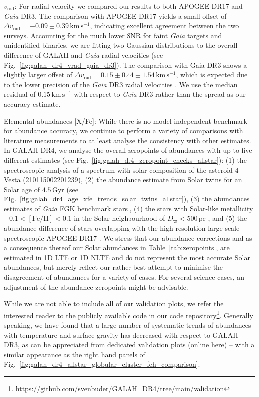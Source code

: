 \documentclass[
  journal=pasa,
  manuscript=research-paper, %
  year=2024,
  volume=37
]{cup-journal}
\newcommand{\vrad}{$v_\mathrm{rad}$\xspace}
\newcommand{\Gaia}{\textit{Gaia}\xspace}
\begin{document}
\vrad: For radial velocity we compared our results to both APOGEE DR17 and \Gaia DR3. The comparison with APOGEE DR17 yields a small offset of $\Delta v_\mathrm{rad} = -0.09 \pm 0.39\,\mathrm{km\,s^{-1}}$, indicating excellent agreement between the two surveys. Accounting for the much lower SNR for faint \Gaia targets and unidentified binaries, we are fitting two Gaussian distributions to the overall difference of GALAH and \Gaia radial velocities (see Fig.~\ref{fig:galah_dr4_vrad_gaia_dr3}). The comparison with Gaia DR3 shows a slightly larger offset of $\Delta v_\mathrm{rad} = 0.15 \pm 0.44 \pm 1.54\,\mathrm{km\,s^{-1}}$, which is expected due to the lower precision of the \Gaia DR3 radial velocities \citep{Katz2023}. We use the median residual of $0.15\,\mathrm{km\,s^{-1}}$ with respect to \Gaia DR3 rather than the spread as our accuracy estimate.

Elemental abundances [X/Fe]: While there is no model-independent benchmark for abundance accuracy, we continue to perform a variety of comparisons with literature measurements to at least analyse the consistency with other estimates. In GALAH DR4, we analyse the overall zeropoints of abundances with up to five different estimates (see Fig.~\ref{fig:galah_dr4_zeropoint_checks_allstar}): (1) the spectroscopic analysis of a spectrum with solar composition of the asteroid 4 Vesta (210115002201239), (2) the abundance estimate from Solar twins for an Solar age of $4.5\,\mathrm{Gyr}$ (see FIg.~\ref{fig:galah_dr4_age_xfe_trends_solar_twins_allstar}), (3) the abundances estimates of \Gaia FGK benchmark stars \citep{Jofre2015, Jofre2018}, (4) the stars with Solar-like metallicity $-0.1 < \mathrm{[Fe/H]} < 0.1$ in the Solar neighbourhood of $D_\varpi < 500\,\mathrm{pc}$ \citep[a method introduced by][]{Joensson2020}, and (5) the abundance difference of stars overlapping with the high-resolution large scale spectroscopic APOGEE DR17 \citep{SDSSDR17}. We stress that our abundance corrections and as a consequence thereof our Solar abundances in Table~\ref{tab:zeropoints}, are estimated in 1D LTE or 1D NLTE and do not represent the most accurate Solar abundances, but merely reflect our rather best attempt to minimise the disagreement of abundances for a variety of cases. For several science cases, an adjustment of the abundance zeropoints might be advisable.

While we are not able to include all of our validation plots, we refer the interested reader to the publicly available code in our code repository\footnote{\url{https://github.com/svenbuder/GALAH_DR4/tree/main/validation}}. Generally speaking, we have found that a large number of systematic trends of abundances with temperature and surface gravity has decreased with respect to GALAH DR3, as can be appreciated from dedicated validation plots (\href{https://github.com/svenbuder/GALAH_DR4/blob/main/validation/galah_dr4_validation_globular_clusters.ipynb}{online here}) -- with a similar appearance as the right hand panels of Fig.~\ref{fig:galah_dr4_allstar_globular_cluster_feh_comparison}.
\end{document}
